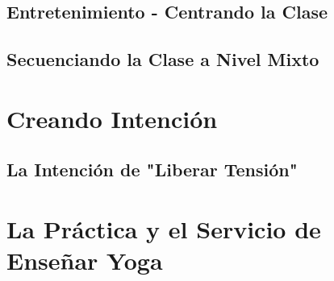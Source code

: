 \subsection{Entretenimiento - Centrando la Clase}
\subsection{Secuenciando la Clase a Nivel Mixto}
\section{Creando Intención}
\subsection{La Intención de "Liberar Tensión"}
\section{La Práctica y el Servicio de Enseñar Yoga}


